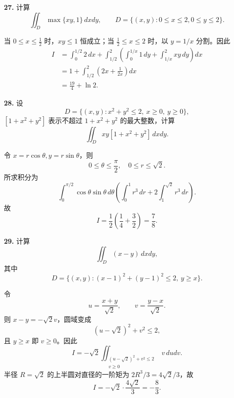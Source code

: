 \begin{problemblock}
\textbf{27.} 计算
\[
\iint_D\max\{xy,1\}\,dxdy,\qquad
D=\{(x,y):0\le x\le2,0\le y\le2\}.
\]
\end{problemblock}

\begin{solutionblock}
当 \(0\le x\le\frac12\) 时，\(xy\le1\) 恒成立；当 \(\frac12\le x\le2\) 时，以 \(y=1/x\) 分割。因此
\[
\begin{aligned}
I&=\int_0^{1/2}2\,dx
+\int_{1/2}^2\left(\int_0^{1/x}1\,dy+\int_{1/x}^2xy\,dy\right)dx\\
&=1+\int_{1/2}^2\left(2x+\frac1{2x}\right)dx\\
&=\boxed{\frac{19}{4}+\ln2}.
\end{aligned}
\]
\end{solutionblock}

\begin{problemblock}
\textbf{28.} 设
\[
D=\{(x,y):x^2+y^2\le2,\ x\ge0,\ y\ge0\},
\]
\([1+x^2+y^2]\) 表示不超过 \(1+x^2+y^2\) 的最大整数，计算
\[
\iint_Dxy[1+x^2+y^2]\,dxdy.
\]
\end{problemblock}

\begin{solutionblock}
令 \(x=r\cos\theta,y=r\sin\theta\)，则
\[
0\le\theta\le\frac{\pi}{2},\quad 0\le r\le\sqrt2.
\]
所求积分为
\[
\int_0^{\pi/2}\cos\theta\sin\theta\,d\theta
\left(\int_0^1r^3\,dr+2\int_1^{\sqrt2}r^3\,dr\right).
\]
故
\[
I=\frac12\left(\frac14+\frac32\right)=\boxed{\frac78}.
\]
\end{solutionblock}

\begin{problemblock}
\textbf{29.} 计算
\[
\iint_D(x-y)\,dxdy,
\]
其中
\[
D=\{(x,y):(x-1)^2+(y-1)^2\le2,\ y\ge x\}.
\]
\end{problemblock}

\begin{solutionblock}
令
\[
u=\frac{x+y}{\sqrt2},\qquad v=\frac{y-x}{\sqrt2}.
\]
则 \(x-y=-\sqrt2v\)，圆域变成
\[
(u-\sqrt2)^2+v^2\le2,
\]
且 \(y\ge x\) 即 \(v\ge0\)。因此
\[
I=-\sqrt2\iint_{\substack{(u-\sqrt2)^2+v^2\le2\\v\ge0}}v\,dudv.
\]
半径 \(R=\sqrt2\) 的上半圆对直径的一阶矩为 \(2R^3/3=4\sqrt2/3\)，故
\[
I=-\sqrt2\cdot\frac{4\sqrt2}{3}
=\boxed{-\frac83}.
\]
\end{solutionblock}


